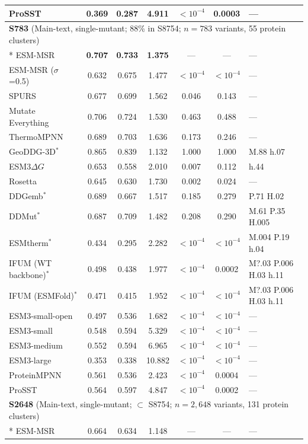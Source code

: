 {\begin{longtable}{lcccccl}
ProSST & 0.369 & 0.287 & 4.911 & $<10^{-4}$ & 0.0003 & --- \\
\midrule
\multicolumn{7}{l}{\textbf{S783} (Main-text, single-mutant; 88\% in S8754; $n=783$ variants, 55 protein clusters)} \\*
\midrule
ESM-MSR & \textbf{0.707} & \textbf{0.733} & \textbf{1.375} & --- & --- & --- \\
ESM-MSR ($\sigma$=0.5) & 0.632 & 0.675 & 1.477 & $<10^{-4}$ & $<10^{-4}$ & --- \\
SPURS & 0.677 & 0.699 & 1.562 & 0.046 & 0.143 & --- \\
Mutate Everything & 0.706 & 0.724 & 1.530 & 0.463 & 0.488 & --- \\
ThermoMPNN & 0.689 & 0.703 & 1.636 & 0.173 & 0.246 & --- \\
GeoDDG-3D$^*$ & 0.865 & 0.839 & 1.132 & 1.000 & 1.000 & M.88 h.07 \\
ESM3$\Delta G$ & 0.653 & 0.558 & 2.010 & 0.007 & 0.112 & h.44 \\
Rosetta & 0.645 & 0.630 & 1.730 & 0.002 & 0.024 & --- \\
DDGemb$^*$ & 0.689 & 0.667 & 1.517 & 0.185 & 0.279 & P.71 H.02 \\
DDMut$^*$ & 0.687 & 0.709 & 1.482 & 0.208 & 0.290 & M.61 P.35 H.005 \\
ESMtherm$^*$ & 0.434 & 0.295 & 2.282 & $<10^{-4}$ & $<10^{-4}$ & M.004 P.19 h.04 \\
IFUM (WT backbone)$^*$ & 0.498 & 0.438 & 1.977 & $<10^{-4}$ & 0.0002 & M?.03 P.006 H.03 h.11 \\
IFUM (ESMFold)$^*$ & 0.471 & 0.415 & 1.952 & $<10^{-4}$ & $<10^{-4}$ & M?.03 P.006 H.03 h.11 \\
ESM3-small-open & 0.497 & 0.536 & 1.682 & $<10^{-4}$ & $<10^{-4}$ & --- \\
ESM3-small & 0.548 & 0.594 & 5.329 & $<10^{-4}$ & $<10^{-4}$ & --- \\
ESM3-medium & 0.552 & 0.594 & 6.965 & $<10^{-4}$ & $<10^{-4}$ & --- \\
ESM3-large & 0.353 & 0.338 & 10.882 & $<10^{-4}$ & $<10^{-4}$ & --- \\
ProteinMPNN & 0.561 & 0.536 & 2.423 & $<10^{-4}$ & 0.0004 & --- \\
ProSST & 0.564 & 0.597 & 4.847 & $<10^{-4}$ & 0.0002 & --- \\
\midrule
\multicolumn{7}{l}{\textbf{S2648} (Main-text, single-mutant; $\subset$ S8754; $n=2,648$ variants, 131 protein clusters)} \\*
\midrule
ESM-MSR & 0.664 & 0.634 & 1.148 & --- & --- & --- \\

\end{longtable}}
